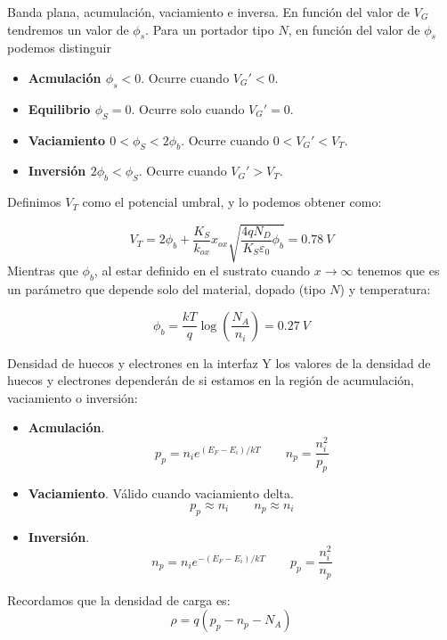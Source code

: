 \documentclass{/home/daniel/GitHub/USC-Physics-Degree-Notes/Notes/Presentacion}
\begin{document}
\begin{frame}{Banda plana, acumulación, vaciamiento e inversa.}
    En función del valor de $V_G$ tendremos un valor de $\phi_s$.  Para un portador tipo $N$, en función del valor de $\phi_s$ podemos distinguir 
    \begin{itemize}
        \item \textbf{Acmulación $\phi_s<0$}. Ocurre cuando $V_G'<0$.
        \item \textbf{Equilibrio $\phi_S=0$}. Ocurre solo cuando $V_G'=0$.
        \item \textbf{Vaciamiento $0< \phi_S <2\phi_b$}.  Ocurre cuando $0<V_G'<V_T$.
        \item \textbf{Inversión $2\phi_b<\phi_S$}. Ocurre cuando $V_G'>V_T$.
    \end{itemize}
    Definimos $V_T$ como el potencial umbral, y lo podemos obtener como: 

    \begin{equation*}
        V_T = 2 \phi_b + \frac{K_S}{k_{ox}} x_{ox} \sqrt{\frac{4qN_D}{K_S\varepsilon_0} \phi_b} = 0.78 \ \unit{V}
    \end{equation*}
    Mientras que $\phi_b$, al estar definido en el sustrato cuando $x\rightarrow\infty$ tenemos que es un parámetro que depende solo del material, dopado (tipo $N$) y temperatura: 

    \begin{equation*}
        \phi_b = \frac{kT}{q} \log \left( \frac{N_A}{n_i}\right) = 0.27 \ \unit{V}
    \end{equation*}    

\end{frame}


\begin{frame}{Densidad de huecos y electrones en la interfaz}
    Y los valores de la densidad de huecos y electrones dependerán de si estamos en la región de acumulación, vaciamiento o inversión: 
    \begin{itemize}
        \item \textbf{Acmulación}.
        \begin{equation*}
            p_p =  n_i e^{(E_F-E_i)/k T}  \qquad n_p = \frac{n_i^2}{p_p}
        \end{equation*}
        \item \textbf{Vaciamiento}. Válido cuando vaciamiento delta. 
        \begin{equation*}
            p_p \approx n_i  \qquad n_p \approx n_i
        \end{equation*}
        \item \textbf{Inversión}. 
        \begin{equation*}
            n_p =  n_i e^{-(E_F-E_i)/k T}  \qquad p_p = \frac{n_i^2}{n_p}
        \end{equation*}
    \end{itemize}
    Recordamos que la densidad de carga es: 
    \begin{equation*}
        \rho = q (p_p - n_p - N_A)
    \end{equation*}
\end{frame}
\end{document}
